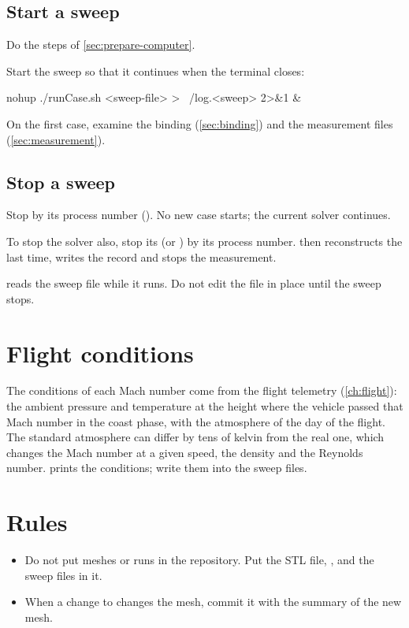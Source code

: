 \subsection{Start a sweep}

\begin{steps}
\item Do the steps of \cref{sec:prepare-computer}.
\item Start the sweep so that it continues when the terminal closes:
\begin{shell}
nohup ./runCase.sh <sweep-file> > ~/log.<sweep> 2>&1 &
\end{shell}
\item On the first case, examine the binding (\cref{sec:binding}) and the measurement
  files (\cref{sec:measurement}).
\end{steps}

\subsection{Stop a sweep}

\begin{steps}
\item Stop  by its process number (). No new case
  starts; the current solver continues.
\item To stop the solver also, stop its  (or ) by its process
  number.  then reconstructs the last time, writes the record and stops
  the measurement.
\end{steps}

\begin{caution}
 reads the sweep file while it runs. Do not edit the file in place
until the sweep stops.
\end{caution}

\section{Flight conditions}\label{sec:flight-conditions}

The conditions of each Mach number come from the flight telemetry
(\cref{ch:flight}): the ambient pressure and temperature at the height where the vehicle
passed that Mach number in the coast phase, with the atmosphere of the day of the
flight. The standard atmosphere can differ by tens of kelvin from the real one, which
changes the Mach number at a given speed, the density and the Reynolds number.
 prints the conditions; write them into the sweep files.

\section{Rules}

\begin{itemize}
\item Do not put meshes or runs in the repository. Put the STL file, ,
   and the sweep files in it.
\item When a change to  changes the mesh, commit it with the
   summary of the new mesh.
\end{itemize}
